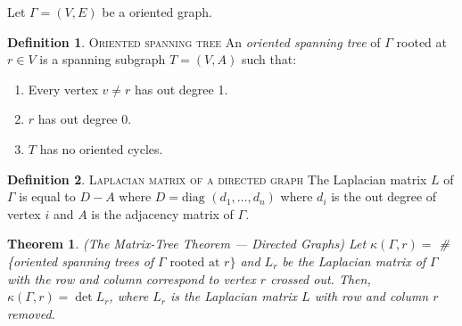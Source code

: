 \documentclass[11pt]{article}
\newtheorem{theorem}{Theorem}[section]
\theoremstyle{definition}
\newtheorem{definition}{Definition}[section]
\begin{document}
	Let $\Gamma = (V,E)$ be a oriented graph.
	
	\theoremstyle{definition}
	\begin{definition}{\textsc{Oriented spanning tree}}
			An \emph{oriented spanning tree} of $\Gamma$ rooted at $r \in V$ is a spanning subgraph $T = (V,A)$ such that:
			\begin{enumerate}
				\item Every vertex $v \neq r$ has out degree 1.
				\item $r$ has out degree 0.
				\item $T$ has no oriented cycles.
			\end{enumerate}
	\end{definition}
	
	\theoremstyle{definition}
	\begin{definition}{\textsc{Laplacian matrix of a directed graph}}
			The Laplacian matrix $L$ of $\Gamma$ is equal to $D-A$ where $D = \text{diag } (d_1, \dots, d_n)$ where $d_i$ is the out degree of vertex $i$ and $A$ is the adjacency matrix of $\Gamma$.
	\end{definition}
	
	\begin{theorem}{(The Matrix-Tree Theorem --- Directed Graphs)}
			Let $\kappa(\Gamma, r) =$ \# \{oriented spanning trees of $\Gamma \text{ rooted at } r\}$ and $L_r$ be the Laplacian matrix of $\Gamma$ with the row and column correspond to vertex $r$ crossed out. 
			Then, $\kappa(\Gamma, r) = \det L_r$, where $L_r$ is the Laplacian matrix $L$ with row and column $r$ removed.
	\end{theorem}
	
\end{document}
